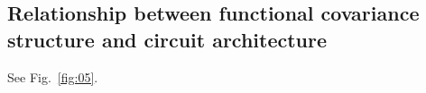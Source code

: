 \subsection*{Relationship between functional covariance structure and circuit architecture}

See Fig.~\ref{fig:05}.


